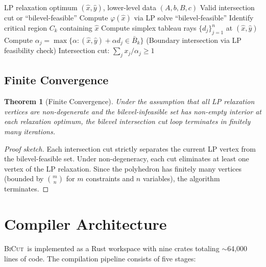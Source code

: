 \documentclass[11pt]{article}
\newtheorem{theorem}{Theorem}
\newcommand{\BiCut}{\textsc{BiCut}}
\begin{document}
\begin{algorithm}[t]
\caption{Bilevel Intersection Cut Separation}
\label{alg:separation}
\begin{algorithmic}[1]
\REQUIRE LP relaxation optimum $(\hat{x}, \hat{y})$, lower-level data $(A, b, B, c)$
\ENSURE Valid intersection cut or ``bilevel-feasible''
\STATE Compute $\varphi(\hat{x})$ via LP solve
  \RETURN ``bilevel-feasible''
\ENDIF
\STATE Identify critical region $C_k$ containing $\hat{x}$
\STATE Compute simplex tableau rays $\{d_j\}_{j=1}^n$ at $(\hat{x}, \hat{y})$
  \STATE Compute $\alpha_j = \max\{\alpha : (\hat{x}, \hat{y}) + \alpha d_j \in \bar{B}_k\}$
  \STATE (Boundary intersection via LP feasibility check)
\ENDFOR
\RETURN Intersection cut: $\sum_{j} x_j / \alpha_j \geq 1$
\end{algorithmic}
\end{algorithm}

\subsection{Finite Convergence}

\begin{theorem}[Finite Convergence]
\label{thm:convergence}
Under the assumption that all LP relaxation vertices are non-degenerate
and the bilevel-infeasible set has non-empty interior at each relaxation
optimum, the bilevel intersection cut loop terminates in finitely many
iterations.
\end{theorem}

\begin{proof}[Proof sketch]
Each intersection cut strictly separates the current LP vertex from the
bilevel-feasible set. Under non-degeneracy, each cut eliminates at least
one vertex of the LP relaxation. Since the polyhedron has finitely many
vertices (bounded by $\binom{m}{n}$ for $m$ constraints and $n$ variables),
the algorithm terminates.
\end{proof}

\section{Compiler Architecture}
\label{sec:compiler}

\BiCut\ is implemented as a Rust workspace with nine crates totaling
$\sim$64,000 lines of code. The compilation pipeline consists of five stages:
\end{document}
